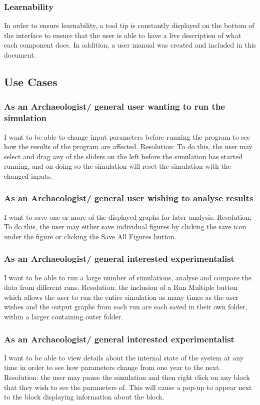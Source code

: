 \documentclass[12pt]{article}
\begin{document}
			\subsubsection{Learnability}
				In order to ensure learnability, a tool tip is constantly displayed on the bottom of the interface to ensure that the user is able to have a live description of what each component does. In addition, a user manual was created and included in this document.
			
		\subsection{Use Cases}
			\subsubsection{As an Archaeologist/ general user wanting to run the simulation}
				I want to be able to change input parameters before running the program to see how the results of the program are affected. Resolution: To do this, the user may select and drag any of the sliders on the left before the simulation has started running, and on doing so the simulation will reset the simulation with the changed inputs.
			\subsubsection{As an Archaeologist/ general user wishing to analyse results}
				I want to save one or more of the displayed graphs for later analysis. Resolution; To do this, the user may either save individual figures by clicking the save icon under the figure or clicking the Save All Figures button.
			\subsubsection{As an Archaeologist/ general interested experimentalist}
				I want to be able to run a large number of simulations, analyse and compare the data from different runs. Resolution: the inclusion of a Run Multiple button which allows the user to run the entire simulation as many times as the user wishes and the output graphs from each run are each saved in their own folder, within a larger containing outer folder.
			\subsubsection{As an Archaeologist/ general interested experimentalist}
				I want to be able to view details about the internal state of the system at any time in order to see how parameters change from one year to the next. Resolution: the user may pause the simulation and then right click on any block that they wish to see the parameters of. This will cause a pop-up to appear next to the block displaying information about the block. 
		
\end{document}
